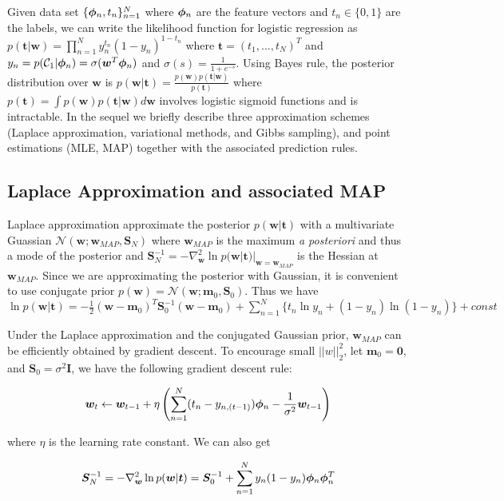 
Given data set $\{\bm{\phi}_n, t_n\}_{n=1}^N$ where $\bm{\phi}_n$ are the feature
vectors and $t_n\in \{0,1\}$ are the labels, we can write the likelihood
function for logistic regression as $p(\bm{t}|\bm{w}) = \prod_{n=1}^N
y_n^{t_n} (1-y_n)^{1-t_n}$ where $\bm{t} = (t_1,...,t_N)^T$ and
$y_n=p(\mathcal{C}_1|\bm{\phi}_n) = \sigma(\bm{w}^T \bm{\phi}_n)$ and $\sigma(s) =
\frac{1}{1+e^{-s}}$. Using Bayes rule, the posterior distribution over
$\bm{w}$ is $p(\bm{w}|\bm{t}) = \frac{p(\bm{w}) p(\bm{t}|\bm{w})}{p(\bm{t})}$
where $p(\bm{t}) = \int p(\bm{w})p(\bm{t}|\bm{w}) d\bm{w}$ involves logistic
sigmoid functions and is intractable. In the sequel we briefly describe three
approximation schemes (Laplace approximation, variational methods, and Gibbs
sampling), and point estimations (MLE, MAP) together with the associated
prediction rules.

\subsection{Laplace Approximation and associated MAP}

Laplace approximation approximate the posterior $p(\bm{w}|\bm{t})$ with a
multivariate Guassian $\mathcal{N}(\bm{w}; \bm{w}_{MAP}, \bm{S}_N)$ where
$\bm{w}_{MAP}$ is the maximum {\it a posteriori} and thus a mode of the
posterior and $\bm{S}_N^{-1} = -\nabla^2_{\bm{w}} \ln
p(\bm{w}|\bm{t})|_{\bm{w} = \bm{w}_{MAP}}$ is the Hessian at $\bm{w}_{MAP}$.
Since we are approximating the posterior with Gaussian, it is convenient to
use conjugate prior $p(\bm{w}) = \mathcal{N}(\bm{w};\bm{m}_0,\bm{S}_0)$. Thus
we have $\ln p(\bm{w}|\bm{t}) = -\frac{1}{2}(\bm{w}-\bm{m}_0)^T
\bm{S}_0^{-1}(\bm{w}-\bm{m}_0) + \sum_{n=1}^N\{t_n \ln y_n +(1-y_n) \ln
(1-y_n)\} + const$

Under the Laplace approximation and the conjugated Gaussian prior, $\bm{w}_{MAP}$
can be efficiently obtained by gradient descent. To encourage small
$||w||^2_2$, let $\bm{m}_0 = \bm{0}$, and $\bm{S}_0 = \sigma^2 \bm{I}$, we
have the following gradient descent rule: 

\begin{equation}
\bm{w}_t \leftarrow \bm{w}_{t-1} + \eta\left( \sum_{n=1}^N (t_n - y_{n,(t-1)}) \bm{\phi}_n -
\frac{1}{\sigma^2}\bm{w}_{t-1} \right)
\end{equation}

where $\eta$ is the learning rate constant. We can also get

\begin{equation}
\bm{S}_N^{-1} = -\nabla^2_{\bm{w}} \ln p(\bm{w}|\bm{t})
= \bm{S}_0^{-1} + \sum_{n=1}^N y_n(1-y_n) \bm{\phi}_n \bm{\phi}_n^T
\end{equation}


